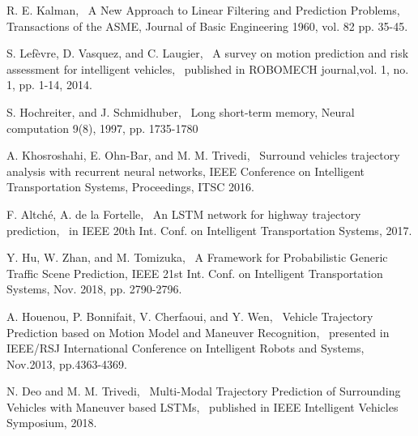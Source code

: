 \documentclass[a4paper, 10pt, conference]{ieeeconf}      %
\begin{document}
\begin{thebibliography}{99}

 R. E. Kalman, ~A New Approach to Linear Filtering and Prediction Problems,
Transactions of the ASME, Journal of Basic Engineering 1960, vol. 82 pp. 35-45.

 S. Lef\`evre, D. Vasquez, and C. Laugier, ~A survey on motion prediction and risk assessment for intelligent vehicles,
~published in ROBOMECH journal,vol. 1, no. 1, pp. 1-14, 2014.

 S. Hochreiter, and J. Schmidhuber, ~Long short-term memory,
Neural computation 9(8), 1997, pp. 1735-1780

 A. Khosroshahi, E. Ohn-Bar, and M. M. Trivedi, ~Surround vehicles trajectory analysis with recurrent neural networks,
IEEE Conference on Intelligent Transportation Systems, Proceedings, ITSC 2016.

 F. Altch\'e, A. de la Fortelle, ~An LSTM network for highway trajectory prediction,
~in IEEE 20th Int. Conf. on Intelligent Transportation Systems, 2017.

 Y. Hu, W. Zhan, and M. Tomizuka, ~A Framework for Probabilistic Generic Traffic Scene Prediction,
IEEE 21st Int. Conf. on Intelligent Transportation Systems, Nov. 2018, pp. 2790-2796.


     A. Houenou, P. Bonnifait, V. Cherfaoui, and Y. Wen, ~Vehicle Trajectory Prediction based on Motion Model and Maneuver Recognition,
~presented in IEEE/RSJ International Conference on Intelligent Robots and Systems, Nov.2013, pp.4363-4369.




 N. Deo and M. M. Trivedi, ~Multi-Modal Trajectory Prediction of Surrounding Vehicles with Maneuver based LSTMs,
~published in IEEE Intelligent Vehicles Symposium, 2018.


\end{thebibliography}
\end{document}
